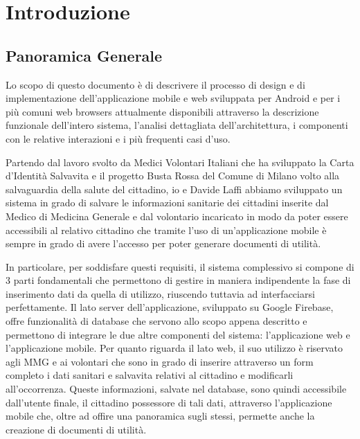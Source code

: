 \documentclass[12pt,a4paper,twoside,openright,titlepage]{book}
\begin{document}
\chapter{Introduzione}
%
\label{cap:introduzione}
\section{Panoramica Generale}
Lo scopo di questo documento è di descrivere il processo di design e di implementazione dell'applicazione mobile e web sviluppata per Android e per i più comuni web browsers attualmente disponibili attraverso la descrizione funzionale dell'intero sistema, l'analisi dettagliata dell'architettura, i componenti con le relative interazioni e i più frequenti casi d'uso.\newline

Partendo dal lavoro svolto da Medici Volontari Italiani che ha sviluppato la Carta d'Identità Salvavita e il progetto Busta Rossa del Comune di Milano volto alla salvaguardia della salute del cittadino, io e Davide Laffi abbiamo sviluppato un sistema in grado di salvare le informazioni sanitarie dei cittadini inserite dal Medico di Medicina Generale e dal volontario incaricato in modo da poter essere accessibili al relativo cittadino che tramite l'uso di un'applicazione mobile è sempre in grado di avere l'accesso per poter generare documenti di utilità.\newline

In particolare, per soddisfare questi requisiti, il sistema complessivo si compone di 3 parti fondamentali che permettono di gestire in maniera indipendente la fase di inserimento dati da quella di utilizzo, riuscendo tuttavia ad interfacciarsi perfettamente. Il lato server dell'applicazione, sviluppato su Google Firebase, offre funzionalità di database che servono allo scopo appena descritto e permettono di integrare le due altre componenti del sistema: l'applicazione web e l'applicazione mobile. Per quanto riguarda il lato web, il suo utilizzo è riservato agli MMG e ai volontari che sono in grado di inserire attraverso un form completo i dati sanitari e salvavita relativi al cittadino e modificarli all'occorrenza. Queste informazioni, salvate nel database, sono quindi accessibile dall'utente finale, il cittadino possessore di tali dati, attraverso l'applicazione mobile che, oltre ad offire una panoramica sugli stessi, permette anche la creazione di documenti di utilità.
\end{document}
